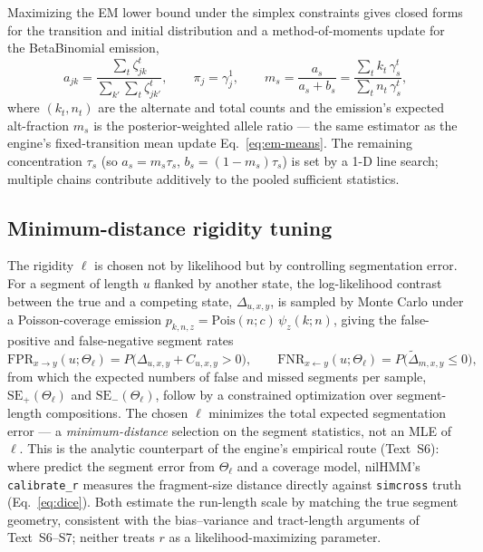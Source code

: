 \documentclass[11pt]{article}
\newcommand{\Pois}{\mathrm{Pois}}
\begin{document}
Maximizing the EM lower bound under the simplex constraints gives closed forms for
the transition and initial distribution and a method-of-moments update for the
BetaBinomial emission,
\begin{equation}
a_{jk}=\frac{\sum_t \zeta^t_{jk}}{\sum_{k'}\sum_t \zeta^t_{jk'}},
\qquad
\pi_j=\gamma^1_j,
\qquad
m_s=\frac{a_s}{a_s+b_s}=\frac{\sum_t k_t\,\gamma^t_s}{\sum_t n_t\,\gamma^t_s},
\label{eq:mstep}
\end{equation}
where $(k_t,n_t)$ are the alternate and total counts and the emission's expected
alt-fraction $m_s$ is the posterior-weighted allele ratio --- the same estimator as
the engine's fixed-transition mean update Eq.~\eqref{eq:em-means}. The remaining
concentration $\tau_s$ (so $a_s=m_s\tau_s$, $b_s=(1-m_s)\tau_s$) is set by a 1-D line
search; multiple chains contribute additively to the pooled sufficient statistics.

\subsection{Minimum-distance rigidity tuning}
\label{sec:rhmm-rigidity}

The rigidity $\ell$ is chosen not by likelihood but by controlling segmentation error.
For a segment of length $u$ flanked by another state, the log-likelihood contrast
between the true and a competing state, $\Delta_{u,x,y}$, is sampled by Monte Carlo
under a Poisson-coverage emission $p_{k,n,z}=\Pois(n;c)\,\psi_z(k;n)$, giving the
false-positive and false-negative segment rates
\begin{equation}
\mathrm{FPR}_{x\to y}(u;\Theta_\ell)=P\!\big(\Delta_{u,x,y}+C_{u,x,y}>0\big),
\qquad
\mathrm{FNR}_{x\leftarrow y}(u;\Theta_\ell)=P\!\big(\tilde\Delta_{m,x,y}\le 0\big),
\label{eq:fprfnr}
\end{equation}
from which the expected numbers of false and missed segments per sample,
$\mathrm{SE}_+(\Theta_\ell)$ and $\mathrm{SE}_-(\Theta_\ell)$, follow by a constrained
optimization over segment-length compositions. The chosen $\ell$ minimizes the total
expected segmentation error --- a \emph{minimum-distance} selection on the segment
statistics, not an MLE of $\ell$. This is the analytic counterpart of the engine's
empirical route (Text~S6): where \citet{rtiger_2023} predict the segment error from
$\Theta_\ell$ and a coverage model, nilHMM's \texttt{calibrate\_r} measures the
fragment-size distance directly against \texttt{simcross} truth
(Eq.~\eqref{eq:dice}). Both estimate the run-length scale by matching the true
segment geometry, consistent with the bias--variance and tract-length arguments of
Text~S6--S7; neither treats $r$ as a likelihood-maximizing parameter.
\end{document}
